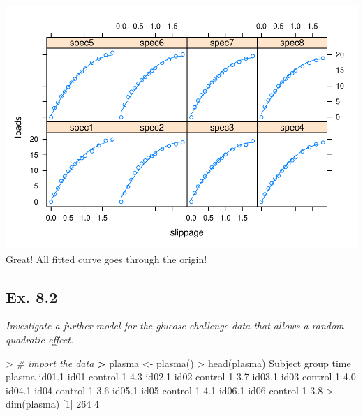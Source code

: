 \documentclass[
]{article}
\newenvironment{Shaded}{\begin{snugshade}}{\end{snugshade}}
\newcommand{\CommentTok}[1]{\textcolor[rgb]{0.56,0.35,0.01}{\textit{#1}}}
\newcommand{\DecValTok}[1]{\textcolor[rgb]{0.00,0.00,0.81}{#1}}
\newcommand{\ErrorTok}[1]{\textcolor[rgb]{0.64,0.00,0.00}{\textbf{#1}}}
\newcommand{\FloatTok}[1]{\textcolor[rgb]{0.00,0.00,0.81}{#1}}
\newcommand{\FunctionTok}[1]{\textcolor[rgb]{0.00,0.00,0.00}{#1}}
\newcommand{\NormalTok}[1]{#1}
\newcommand{\OtherTok}[1]{\textcolor[rgb]{0.56,0.35,0.01}{#1}}
\newcommand{\SpecialCharTok}[1]{\textcolor[rgb]{0.00,0.00,0.00}{#1}}
\begin{document}
\includegraphics{HUDM6122-Homework_10-Chenguang-Pan_files/figure-latex/unnamed-chunk-3-1.pdf}
Great! All fitted curve goes through the origin!

\hypertarget{ex.-8.2}{%
\subsection{Ex. 8.2}\label{ex.-8.2}}

\emph{Investigate a further model for the glucose challenge data that
allows a random quadratic effect.}

\begin{Shaded}
\begin{Highlighting}[]
\SpecialCharTok{\textgreater{}} \CommentTok{\# import the data}
\ErrorTok{\textgreater{}}\NormalTok{ plasma }\OtherTok{\textless{}{-}} \FunctionTok{plasma}\NormalTok{()}
\SpecialCharTok{\textgreater{}} \FunctionTok{head}\NormalTok{(plasma)}
\NormalTok{       Subject   group time plasma}
\NormalTok{id01}\FloatTok{.1}\NormalTok{    id01 control    }\DecValTok{1}    \FloatTok{4.3}
\NormalTok{id02}\FloatTok{.1}\NormalTok{    id02 control    }\DecValTok{1}    \FloatTok{3.7}
\NormalTok{id03}\FloatTok{.1}\NormalTok{    id03 control    }\DecValTok{1}    \FloatTok{4.0}
\NormalTok{id04}\FloatTok{.1}\NormalTok{    id04 control    }\DecValTok{1}    \FloatTok{3.6}
\NormalTok{id05}\FloatTok{.1}\NormalTok{    id05 control    }\DecValTok{1}    \FloatTok{4.1}
\NormalTok{id06}\FloatTok{.1}\NormalTok{    id06 control    }\DecValTok{1}    \FloatTok{3.8}
\SpecialCharTok{\textgreater{}} \FunctionTok{dim}\NormalTok{(plasma)}
\NormalTok{[}\DecValTok{1}\NormalTok{] }\DecValTok{264}   \DecValTok{4}
\end{Highlighting}
\end{Shaded}
\end{document}
